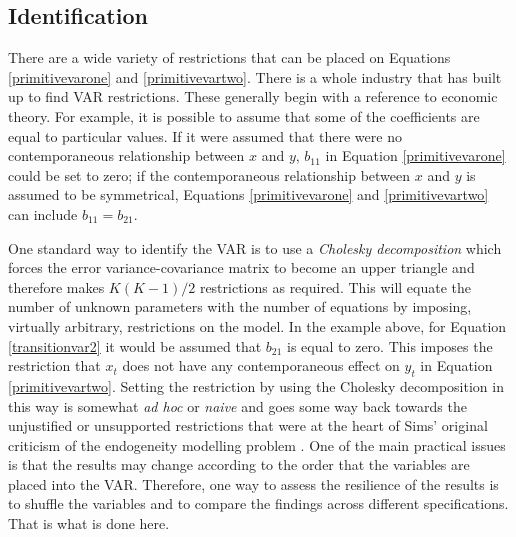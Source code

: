 \documentclass[12pt, a4paper, oneside]{article}\usepackage[]{graphicx}\usepackage[]{color}
\begin{document}
\subsection{Identification}\label{secref:ident}
There are a wide variety of restrictions that can be placed on Equations \ref{primitivevarone} and \ref{primitivevartwo}. There is a whole industry that has built up to find VAR restrictions.  These generally begin with a reference to economic theory.  For example, it is possible to assume that some of the coefficients are equal to particular values. If it were assumed that there were no contemporaneous relationship between $x$ and $y$, $b_{11}$ in Equation \ref{primitivevarone} could be set to zero; if  the contemporaneous relationship between $x$ and $y$ is assumed to be symmetrical, Equations \ref{primitivevarone} and \ref{primitivevartwo} can include $b_{11} = b_{21}$.    

One standard way to identify the VAR is to use a \emph{Cholesky decomposition} which forces the error variance-covariance matrix to become an upper triangle and therefore makes $K(K-1)/2$ restrictions as required.   This will equate the number of unknown parameters with the number of equations by imposing, virtually arbitrary, restrictions on the model.  In the example above, for Equation \ref{transitionvar2} it would be assumed that $b_{21}$ is equal to zero.  This imposes the restriction that $x_t$ does not have any contemporaneous effect on $y_t$ in Equation \ref{primitivevartwo}. Setting the restriction by using the Cholesky decomposition in this way is somewhat \emph{ad hoc} or \emph{naive} and goes some way back towards the unjustified or unsupported restrictions that were at the heart of Sims' original criticism of the endogeneity modelling problem \citep{Sims1980Macroeconomics}.  One of the main practical issues is that the results may change according to the order that the variables are placed into the VAR.  Therefore, one way to assess the resilience of the results is to shuffle the variables and to compare the findings across different specifications.  That is what is done here.  
 
\end{document}
